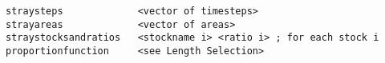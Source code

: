 \documentclass [a4paper, 10pt]{book}
\begin{document}
{\small\begin{verbatim}
straysteps             <vector of timesteps>
strayareas             <vector of areas>
straystocksandratios   <stockname i> <ratio i> ; for each stock i
proportionfunction     <see Length Selection>
\end{verbatim}}





\end{document}
